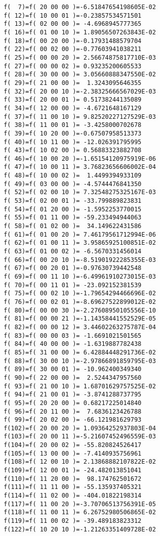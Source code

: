 \begin{footnotesize}
\begin{verbatim}
 f(  7)=f( 20 00 00 )=-6.51847654198605E-02
 f( 12)=f( 10 00 01 )=-0.23857534571501
 f( 13)=f( 02 00 00 )= -4.6968945777365
 f( 16)=f( 01 00 10 )= 1.89056507263843E-02
 f( 18)=f( 00 20 00 )=-0.17931488579704
 f( 22)=f( 00 02 00 )=-0.77603941038211
 f( 25)=f( 00 00 20 )= 2.56674875817710E-03
 f( 27)=f( 00 00 02 )= 0.93235200605533
 f( 28)=f( 30 00 00 )= 3.05660888347550E-02
 f( 29)=f( 21 00 00 )=  1.3243095646355
 f( 32)=f( 20 00 10 )=-2.38325666567029E-03
 f( 33)=f( 20 00 01 )= 0.51738244135089
 f( 34)=f( 12 00 00 )= -4.6721648167129
 f( 37)=f( 11 00 10 )= 9.82520227127529E-03
 f( 38)=f( 11 00 01 )= -3.4258000702678
 f( 39)=f( 10 20 00 )=-0.67507958513373
 f( 40)=f( 10 11 00 )= -12.026391795995
 f( 43)=f( 10 02 00 )= 0.56883323882708
 f( 46)=f( 10 00 20 )=-1.65154120975919E-06
 f( 47)=f( 10 00 11 )= 3.76823656606002E-04
 f( 48)=f( 10 00 02 )=  1.4499394933109
 f( 49)=f( 03 00 00 )= -4.5744476841350
 f( 52)=f( 02 00 10 )= 7.32548275325167E-03
 f( 53)=f( 02 00 01 )= -33.799889823831
 f( 54)=f( 01 20 00 )= -1.5952253770015
 f( 55)=f( 01 11 00 )= -59.233494944063
 f( 58)=f( 01 02 00 )=  34.149622431586
 f( 61)=f( 01 00 20 )= 7.46179561712994E-06
 f( 62)=f( 01 00 11 )= 3.95865925100851E-02
 f( 63)=f( 01 00 02 )= -6.5670331456014
 f( 66)=f( 00 20 10 )=-8.51901922285355E-03
 f( 67)=f( 00 20 01 )=-0.97630739442548
 f( 69)=f( 00 11 10 )=-6.49961910273015E-03
 f( 70)=f( 00 11 01 )= -23.092152381539
 f( 75)=f( 00 02 10 )=-1.79654294466696E-02
 f( 76)=f( 00 02 01 )=-8.69627522899012E-02
 f( 80)=f( 00 00 30 )=-2.27608950105556E-10
 f( 81)=f( 00 00 21 )=-1.14358441552529E-05
 f( 82)=f( 00 00 12 )= 3.44602263275787E-04
 f( 83)=f( 00 00 03 )= -1.6691021501565
 f( 84)=f( 40 00 00 )= -1.6319887782438
 f( 85)=f( 31 00 00 )= 6.42884448291736E-02
 f( 88)=f( 30 00 10 )=-2.97866891859795E-03
 f( 89)=f( 30 00 01 )= -10.962400349340
 f( 90)=f( 22 00 00 )=  2.5244347957560
 f( 93)=f( 21 00 10 )= 1.68701629757525E-02
 f( 94)=f( 21 00 01 )= -3.8741288737795
 f( 95)=f( 20 20 00 )= 0.68217225014840
 f( 96)=f( 20 11 00 )=  7.6836123426788
 f( 99)=f( 20 02 00 )= -66.121981629793
 f(102)=f( 20 00 20 )= 1.09364252937803E-04
 f(103)=f( 20 00 11 )=-5.21607452496559E-03
 f(104)=f( 20 00 02 )= -55.820824526417
 f(105)=f( 13 00 00 )= -7.4140935756961
 f(108)=f( 12 00 10 )= 2.13868882107822E-02
 f(109)=f( 12 00 01 )= -24.482013851041
 f(110)=f( 11 20 00 )=  98.174762501672
 f(111)=f( 11 11 00 )= -55.135937405321
 f(114)=f( 11 02 00 )= -404.01822198314
 f(117)=f( 11 00 20 )=-3.70706513756391E-05
 f(118)=f( 11 00 11 )= 6.26752980506865E-02
 f(119)=f( 11 00 02 )= -39.489183823312
 f(122)=f( 10 20 10 )=-1.21263351409728E-02

\end{verbatim}
\end{footnotesize}

